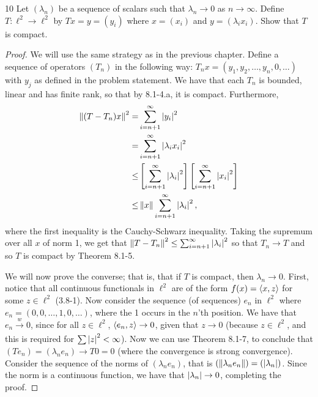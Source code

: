 \begin{exercise}{10}
Let $(\lambda_n)$ be a sequence of scalars such that $\lambda_n \to 0$ as $n \to \infty$.
Define $T: \ell^2 \to \ell^2$ by $T x = y = (y_i)$ where $x = (x_i)$ and $y = (\lambda_i x_i)$.
Show that $T$ is compact.
\end{exercise}
\begin{proof}
We will use the same strategy as in the previous chapter. 
Define a sequence of operators $(T_n)$ in the following way:
$T_n x = (y_1, y_2, \dots, y_n, 0, \dots)$ with $y_j$ as defined in the problem statement.
We have that each $T_n$ is bounded, linear and has finite rank, so that by 8.1-4.a, it is compact. 
Furthermore,
\begin{align*}
    \left\lVert (T - T_n) x\right\rVert^2
    =& \sum_{i = n+1}^\infty \left\lvert y_i\right\rvert^2\\
    =& \sum_{i = n+1}^\infty  \left\lvert \lambda_{i} x_i\right\rvert^2\\
    \leq& \left[ \sum_{i = n+1}^\infty \left\lvert \lambda_{i}\right\rvert^2\right] \left[ \sum_{i = n+1}^\infty \left\lvert x_i\right\rvert^2\right]\\
    \leq& \left\lVert x\right\rVert \sum_{i = n+1}^\infty  \left\lvert \lambda_{i}\right\rvert^2,
\end{align*}
where the first inequality is the Cauchy-Schwarz inequality.
Taking the supremum over all $x$ of norm 1, we get that $\left\lVert T - T_n\right\rVert^2 \leq \sum_{i = n+1}^\infty \left\lvert \lambda_{i}\right\rvert^2$ so that $T_n \to T$ and so $T$ is compact by Theorem 8.1-5.

We will now prove the converse;
that is, that if $T$ is compact, then $\lambda_n \to 0$.
First, notice that all continuous functionals in $\ell^2$ are of the form $f(x) = \langle x, z\rangle$ for some $z \in \ell^2$ (3.8-1).
Now consider the sequence (of sequences) $e_n$ in $\ell^2$ where $e_n = (0, 0, \dots, 1, 0, \dots )$, where the 1 occurs in the $n$'th position.
We have that $e_n \xrightarrow[]{w} 0$, since for all $z \in \ell^2$, $\langle e_n, z\rangle \to 0$, given that $z \to 0$ (because $z \in \ell^2$, and this is required for $\sum \left\lvert z\right\rvert^2 < \infty$).
Now we can use Theorem 8.1-7, to conclude that $(T e_n) = (\lambda_n e_n) \to T0 = 0$ (where the convergence is strong convergence).
Consider the sequence of the norms of $(\lambda_n e_n)$, that is $(\left\lVert \lambda_n e_n\right\rVert) = (\left\lvert \lambda_n\right\rvert)$.
Since the norm is a continuous function, we have that $\left\lvert \lambda_n\right\rvert \to 0$, completing the proof.
\end{proof} 

